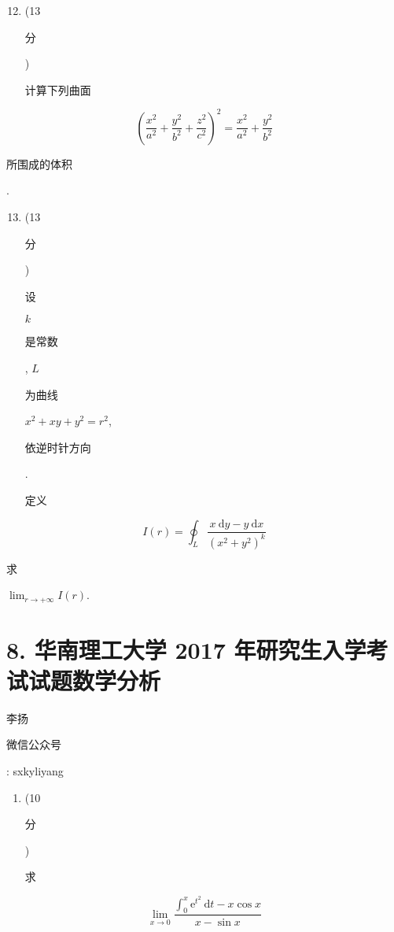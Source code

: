 \documentclass[10pt]{article}
\begin{document}
\begin{enumerate}
  \setcounter{enumi}{11}
  \item (13 \begin{CJK}{UTF8}{mj}分\end{CJK}) \begin{CJK}{UTF8}{mj}计算下列曲面\end{CJK}
\end{enumerate}
$$
\left(\frac{x^{2}}{a^{2}}+\frac{y^{2}}{b^{2}}+\frac{z^{2}}{c^{2}}\right)^{2}=\frac{x^{2}}{a^{2}}+\frac{y^{2}}{b^{2}}
$$
\begin{CJK}{UTF8}{mj}所围成的体积\end{CJK}.

\begin{enumerate}
  \setcounter{enumi}{12}
  \item (13 \begin{CJK}{UTF8}{mj}分\end{CJK}) \begin{CJK}{UTF8}{mj}设\end{CJK} $k$ \begin{CJK}{UTF8}{mj}是常数\end{CJK}, $L$ \begin{CJK}{UTF8}{mj}为曲线\end{CJK} $x^{2}+x y+y^{2}=r^{2}$, \begin{CJK}{UTF8}{mj}依逆时针方向\end{CJK}. \begin{CJK}{UTF8}{mj}定义\end{CJK}
\end{enumerate}
$$
I(r)=\oint_{L} \frac{x \mathrm{~d} y-y \mathrm{~d} x}{\left(x^{2}+y^{2}\right)^{k}}
$$
\begin{CJK}{UTF8}{mj}求\end{CJK} $\lim _{r \rightarrow+\infty} I(r)$.

\section{8. 华南理工大学 2017 年研究生入学考试试题数学分析}
\begin{CJK}{UTF8}{mj}李扬\end{CJK}

\begin{CJK}{UTF8}{mj}微信公众号\end{CJK}: sxkyliyang

\begin{enumerate}
  \item (10 \begin{CJK}{UTF8}{mj}分\end{CJK}) \begin{CJK}{UTF8}{mj}求\end{CJK}
\end{enumerate}
$$
\lim _{x \rightarrow 0} \frac{\int_{0}^{x} \mathrm{e}^{t^{2}} \mathrm{~d} t-x \cos x}{x-\sin x}
$$
\end{document}
